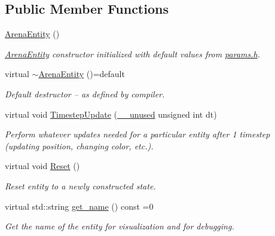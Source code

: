 \subsection*{Public Member Functions}
\begin{DoxyCompactItemize}
\item 
\mbox{\label{class_arena_entity_a96df749814e89344a6149e4da89b4e44}} 
\mbox{\hyperlink{class_arena_entity_a96df749814e89344a6149e4da89b4e44}{Arena\+Entity}} ()
\begin{DoxyCompactList}\small\item\em \mbox{\hyperlink{class_arena_entity}{Arena\+Entity}} constructor initialized with default values from \mbox{\hyperlink{params_8h}{params.\+h}}. \end{DoxyCompactList}\item 
\mbox{\label{class_arena_entity_aa7af53e5d8830d144ccf2ad07d9140da}} 
virtual \mbox{\hyperlink{class_arena_entity_aa7af53e5d8830d144ccf2ad07d9140da}{$\sim$\+Arena\+Entity}} ()=default
\begin{DoxyCompactList}\small\item\em Default destructor -- as defined by compiler. \end{DoxyCompactList}\item 
virtual void \mbox{\hyperlink{class_arena_entity_a203613c40a5cecf47606b2a59adcc3bd}{Timestep\+Update}} (\mbox{\hyperlink{common_8h_a2e3484535ee610c8e19e9859563abe48}{\+\_\+\+\_\+unused}} unsigned int dt)
\begin{DoxyCompactList}\small\item\em Perform whatever updates needed for a particular entity after 1 timestep (updating position, changing color, etc.). \end{DoxyCompactList}\item 
\mbox{\label{class_arena_entity_abaebe6c02659e22c08579d49829c5676}} 
virtual void \mbox{\hyperlink{class_arena_entity_abaebe6c02659e22c08579d49829c5676}{Reset}} ()
\begin{DoxyCompactList}\small\item\em Reset entity to a newly constructed state. \end{DoxyCompactList}\item 
virtual std\+::string \mbox{\hyperlink{class_arena_entity_ad43152003033cf01ad86eeff1990b69a}{get\+\_\+name}} () const =0
\begin{DoxyCompactList}\small\item\em Get the name of the entity for visualization and for debugging. \end{DoxyCompactList}\item 

\end{DoxyCompactItemize}
